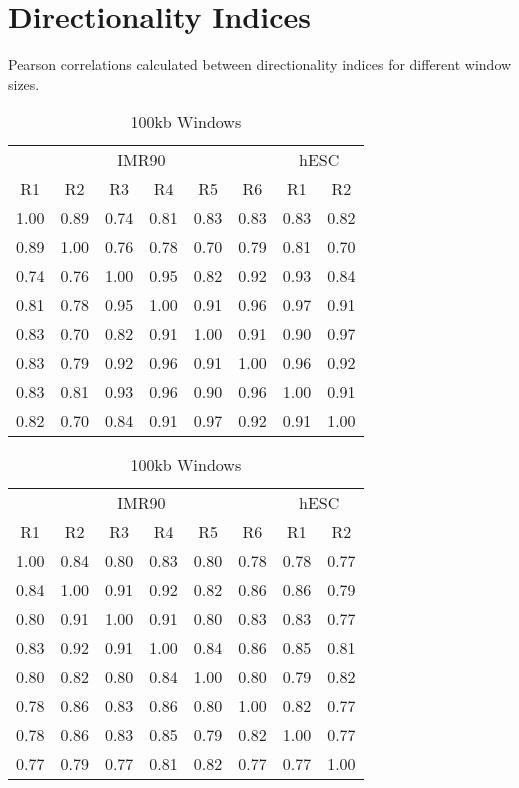 \newpage
\section*{Directionality Indices}\label{sec:SuppDirectionality}

Pearson correlations calculated between directionality indices for different window sizes.

\begin{table}[H]
  \caption{Directionality Indices}
  \parbox{.45\linewidth}{%
    \centering
    \caption{1Mb Windows}\label{tab:SuppDi1MBWindows}
    \begin{tabular}{*{8}{c}}
      \toprule
      \multicolumn{6}{c}{IMR90} & \multicolumn{2}{c}{hESC} \\
      R1 & R2 & R3 & R4 & R5 & R6 & R1 & R2 \\
      \midrule
      1.00 & 0.89 & 0.74 & 0.81 & 0.83 & 0.83 & 0.83 & 0.82 \\
      0.89 & 1.00 & 0.76 & 0.78 & 0.70 & 0.79 & 0.81 & 0.70 \\
      0.74 & 0.76 & 1.00 & 0.95 & 0.82 & 0.92 & 0.93 & 0.84 \\
      0.81 & 0.78 & 0.95 & 1.00 & 0.91 & 0.96 & 0.97 & 0.91 \\
      0.83 & 0.70 & 0.82 & 0.91 & 1.00 & 0.91 & 0.90 & 0.97 \\
      0.83 & 0.79 & 0.92 & 0.96 & 0.91 & 1.00 & 0.96 & 0.92 \\
      0.83 & 0.81 & 0.93 & 0.96 & 0.90 & 0.96 & 1.00 & 0.91 \\
      0.82 & 0.70 & 0.84 & 0.91 & 0.97 & 0.92 & 0.91 & 1.00 \\
      \bottomrule
    \end{tabular}
  }%
  \hfill
  \parbox{.45\linewidth}{%
    \centering
    \caption{100kb Windows}\label{tab:SuppDi100kbWindows}
    \begin{tabular}{*{8}{c}}
      \toprule
      \multicolumn{6}{c}{IMR90} & \multicolumn{2}{c}{hESC} \\
      R1 & R2 & R3 & R4 & R5 & R6 & R1 & R2 \\
      \midrule
      1.00 & 0.84 & 0.80 & 0.83 & 0.80 & 0.78 & 0.78 & 0.77 \\
      0.84 & 1.00 & 0.91 & 0.92 & 0.82 & 0.86 & 0.86 & 0.79 \\
      0.80 & 0.91 & 1.00 & 0.91 & 0.80 & 0.83 & 0.83 & 0.77 \\
      0.83 & 0.92 & 0.91 & 1.00 & 0.84 & 0.86 & 0.85 & 0.81 \\
      0.80 & 0.82 & 0.80 & 0.84 & 1.00 & 0.80 & 0.79 & 0.82 \\
      0.78 & 0.86 & 0.83 & 0.86 & 0.80 & 1.00 & 0.82 & 0.77 \\
      0.78 & 0.86 & 0.83 & 0.85 & 0.79 & 0.82 & 1.00 & 0.77 \\
      0.77 & 0.79 & 0.77 & 0.81 & 0.82 & 0.77 & 0.77 & 1.00 \\
      \bottomrule
    \end{tabular}
  }
\end{table}
